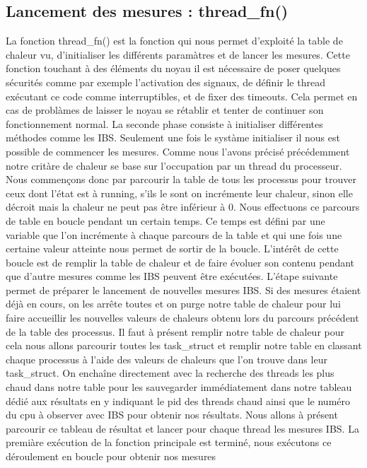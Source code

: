 			\subsection{Lancement des mesures : thread\_fn()}
				La fonction thread\_fn() est la fonction qui nous permet d'exploité la table de chaleur vu, d'initialiser
				les différents paramàtres et de lancer les mesures.
				Cette fonction touchant à des éléments du noyau il est nécessaire de poser quelques sécurités comme par exemple l'activation des signaux, de définir le thread exécutant ce code comme interruptibles, et de fixer des timeouts. Cela permet en cas de problàmes de laisser le noyau se rétablir et tenter de continuer son fonctionnement normal.
				La seconde phase consiste à initialiser différentes méthodes comme les IBS.
				Seulement une fois le systàme initialiser il nous est possible de commencer les mesures.
				Comme nous l'avons précisé précédemment notre critàre de chaleur se base sur l'occupation par un thread du processeur. Nous commençons donc par parcourir la table de tous les processus pour trouver ceux dont l'état est à running, s'ils le sont on incrémente leur chaleur, sinon elle décroit mais la chaleur ne peut pas être inférieur à 0.
				Nous effectuons ce parcours de table en boucle pendant un certain temps. Ce temps est défini par une variable que l'on incrémente à chaque parcours de la table et qui une fois une certaine valeur atteinte nous permet de sortir de la boucle. L’intérêt de cette boucle est de remplir la table de chaleur et de faire évoluer son contenu pendant que d'autre mesures comme les IBS peuvent être exécutées.
				L'étape suivante permet de préparer le lancement de nouvelles mesures IBS. Si des mesures étaient déjà en cours, on les arrête toutes et on purge notre table de chaleur pour lui faire accueillir les nouvelles valeurs de chaleurs obtenu lors du parcours précédent de la table des processus.
				Il faut à présent remplir notre table de chaleur pour cela nous allons parcourir toutes les task\_struct et remplir notre table en classant chaque processus à l'aide des valeurs de chaleurs que l'on trouve dans leur task\_struct. On enchaîne directement avec la recherche des threads les plus chaud dans notre table pour les sauvegarder immédiatement dans notre tableau dédié aux résultats en y indiquant le pid des threads chaud ainsi que le numéro du cpu à observer avec IBS pour obtenir nos résultats.
				Nous allons à présent parcourir ce tableau de résultat et lancer pour chaque thread les mesures IBS.
				La premiàre exécution de la fonction principale est terminé, nous exécutons ce déroulement en boucle pour obtenir nos mesures
